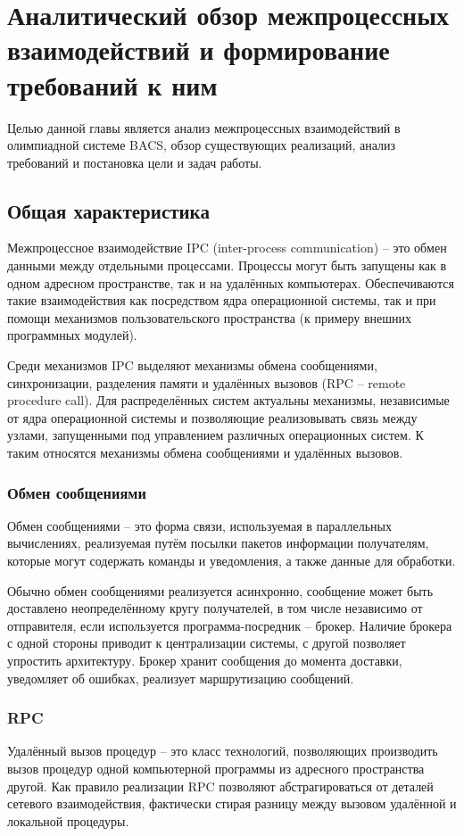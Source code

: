 \chapter{Аналитический обзор межпроцессных взаимодействий
и формирование требований к ним}

Целью данной главы является анализ межпроцессных взаимодействий
в олимпиадной системе BACS, обзор существующих реализаций,
анализ требований и постановка цели и задач работы.

\section{Общая характеристика}
Межпроцессное взаимодействие IPC (inter-process communication) --
это обмен данными между отдельными процессами.
Процессы могут быть запущены как в одном адресном пространстве,
так и на удалённых компьютерах. Обеспечиваются такие взаимодействия
как посредством ядра операционной системы, так и при помощи механизмов
пользовательского пространства (к примеру внешних программных модулей).

Среди механизмов IPC выделяют механизмы обмена сообщениями, синхронизации,
разделения памяти и удалённых вызовов (RPC -- remote procedure call).
Для распределённых систем актуальны механизмы, независимые от ядра операционной
системы и позволяющие реализовывать связь между узлами, запущенными
под управлением различных операционных систем. К таким относятся механизмы
обмена сообщениями и удалённых вызовов.

\subsection{Обмен сообщениями}
Обмен сообщениями -- это форма связи, используемая в параллельных вычислениях,
реализуемая путём посылки пакетов информации получателям, которые могут
содержать команды и уведомления, а также данные для обработки.

Обычно обмен сообщениями реализуется асинхронно, сообщение может быть доставлено
неопределённому кругу получателей, в том числе независимо от отправителя,
если используется программа-посредник -- брокер. Наличие брокера с одной стороны
приводит к централизации системы, с другой позволяет упростить архитектуру.
Брокер хранит сообщения до момента доставки, уведомляет об ошибках,
реализует маршрутизацию сообщений.

\subsection{RPC}
Удалённый вызов процедур -- это класс технологий, позволяющих производить
вызов процедур одной компьютерной программы из адресного пространства другой.
Как правило реализации RPC позволяют абстрагироваться от деталей сетевого
взаимодействия, фактически стирая разницу между вызовом удалённой и локальной
процедуры.


